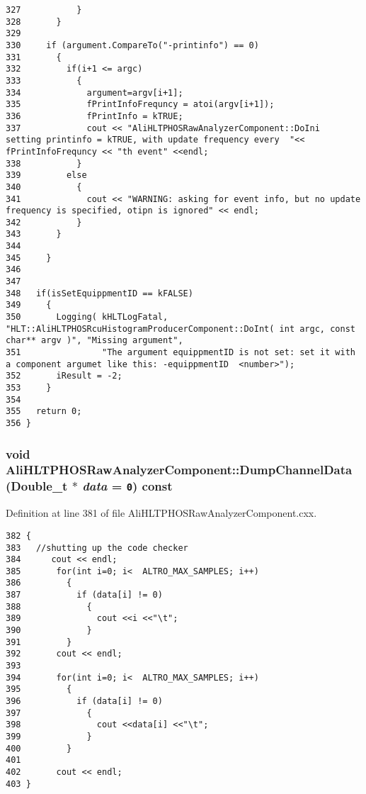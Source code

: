 \begin{verbatim}
327           }     
328       }
329 
330     if (argument.CompareTo("-printinfo") == 0) 
331       {
332         if(i+1 <= argc)
333           {
334             argument=argv[i+1];
335             fPrintInfoFrequncy = atoi(argv[i+1]);
336             fPrintInfo = kTRUE;
337             cout << "AliHLTPHOSRawAnalyzerComponent::DoIni  setting printinfo = kTRUE, with update frequency every  "<< fPrintInfoFrequncy << "th event" <<endl; 
338           }
339         else
340           {
341             cout << "WARNING: asking for event info, but no update frequency is specified, otipn is ignored" << endl;
342           }
343       }
344  
345     }
346 
347 
348   if(isSetEquippmentID == kFALSE)
349     {
350       Logging( kHLTLogFatal, "HLT::AliHLTPHOSRcuHistogramProducerComponent::DoInt( int argc, const char** argv )", "Missing argument",
351                "The argument equippmentID is not set: set it with a component argumet like this: -equippmentID  <number>");
352       iResult = -2; 
353     }
354 
355   return 0;
356 }
\end{verbatim}\normalsize 


\subsubsection{\setlength{\rightskip}{0pt plus 5cm}void Ali\-HLTPHOSRaw\-Analyzer\-Component::Dump\-Channel\-Data (Double\_\-t $\ast$ {\em data} = {\tt 0}) const}\label{classAliHLTPHOSRawAnalyzerComponent_a8}




Definition at line 381 of file Ali\-HLTPHOSRaw\-Analyzer\-Component.cxx.

\footnotesize\begin{verbatim}382 {
383   //shutting up the code checker 
384      cout << endl;
385       for(int i=0; i<  ALTRO_MAX_SAMPLES; i++)
386         {
387           if (data[i] != 0)
388             {
389               cout <<i <<"\t";
390             }
391         }
392       cout << endl;
393       
394       for(int i=0; i<  ALTRO_MAX_SAMPLES; i++)
395         {
396           if (data[i] != 0)
397             {
398               cout <<data[i] <<"\t";
399             }
400         }
401       
402       cout << endl;
403 }
\end{verbatim}\normalsize 


